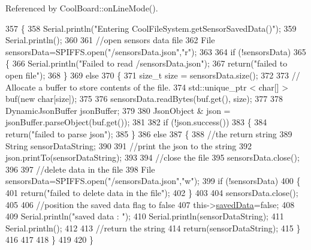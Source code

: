 Referenced by Cool\+Board\+::on\+Line\+Mode().


\begin{DoxyCode}
357 \{
358     Serial.println(\textcolor{stringliteral}{"Entering CoolFileSystem.getSensorSavedData()"});
359     Serial.println();
360 
361     \textcolor{comment}{//open sensors data file}
362     File sensorsData=SPIFFS.open(\textcolor{stringliteral}{"/sensorsData.json"},\textcolor{stringliteral}{"r"});
363     
364     \textcolor{keywordflow}{if} (!sensorsData)
365     \{
366         Serial.println(\textcolor{stringliteral}{"Failed to read /sensorsData.json"}); 
367         \textcolor{keywordflow}{return}(\textcolor{stringliteral}{"failed to open file"});
368     \}
369     \textcolor{keywordflow}{else}
370     \{
371         \textcolor{keywordtype}{size\_t} size = sensorsData.size();
372 
373         \textcolor{comment}{// Allocate a buffer to store contents of the file.}
374         std::unique\_ptr < char[] > buf(\textcolor{keyword}{new} \textcolor{keywordtype}{char}[size]);
375 
376         sensorsData.readBytes(buf.get(), size);
377 
378         DynamicJsonBuffer jsonBuffer;
379 
380         JsonObject & json = jsonBuffer.parseObject(buf.get());
381         
382         \textcolor{keywordflow}{if} (!json.success())
383         \{
384             \textcolor{keywordflow}{return}(\textcolor{stringliteral}{"failed to parse json"});
385         \}
386         \textcolor{keywordflow}{else}
387         \{   
388             \textcolor{comment}{//the return string}
389             String sensorDataString;
390             
391             \textcolor{comment}{//print the json to the string}
392             json.printTo(sensorDataString);
393             
394             \textcolor{comment}{//close the file}
395             sensorsData.close();
396 
397             \textcolor{comment}{//delete data in the file}
398             File sensorsData=SPIFFS.open(\textcolor{stringliteral}{"/sensorsData.json"},\textcolor{stringliteral}{"w"});
399             \textcolor{keywordflow}{if} (!sensorsData)   
400             \{
401                 \textcolor{keywordflow}{return}(\textcolor{stringliteral}{"failed to delete data in the file"});
402             \}
403 
404             sensorsData.close();
405             
406             \textcolor{comment}{//position the saved data flag to false}
407             this->\hyperlink{classCoolFileSystem_ad398e0c5c41a0c88acdf5d672aa71351}{savedData}=\textcolor{keyword}{false}; 
408         
409             Serial.println(\textcolor{stringliteral}{"saved data : "});
410             Serial.println(sensorDataString);
411             Serial.println();
412 
413             \textcolor{comment}{//return the string}
414             \textcolor{keywordflow}{return}(sensorDataString);       
415         \}
416         
417         
418     \}
419 
420 \}
\end{DoxyCode}

